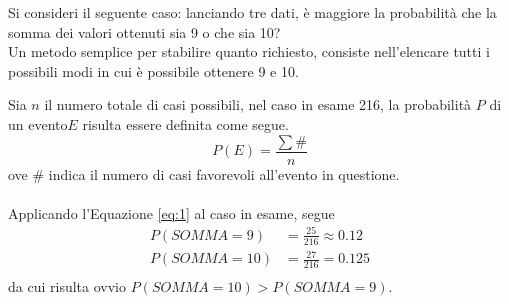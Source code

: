 \documentclass{subfiles}
\begin{document}
Si consideri il seguente caso: lanciando tre dati, è maggiore la probabilità che la somma dei valori ottenuti sia 9 o che sia 10?\\
Un metodo semplice per stabilire quanto richiesto, consiste nell'elencare tutti i possibili modi in cui è possibile ottenere 9 e 10.


\noindent
Sia \(n\) il numero totale di casi possibili, nel caso in esame 216, la probabilità \(P\) di un evento\footnotemark[1] \(E\) risulta essere definita come segue.
\begin{equation}
    P(E) = \frac{\sum \#}{n}
\end{equation}
ove \(\#\) indica il numero di casi favorevoli all'evento in questione.
\\ \\
Applicando l'Equazione \eqref{eq:1} al caso in esame, segue
\[\begin{aligned}
        P(SOMMA = 9)  & = \frac{25}{216} \approx 0.12 \\
        P(SOMMA = 10) & = \frac{27}{216} = 0.125      \\
    \end{aligned}\]
da cui risulta ovvio \(P(SOMMA = 10) > P(SOMMA = 9)\).

\end{document}
